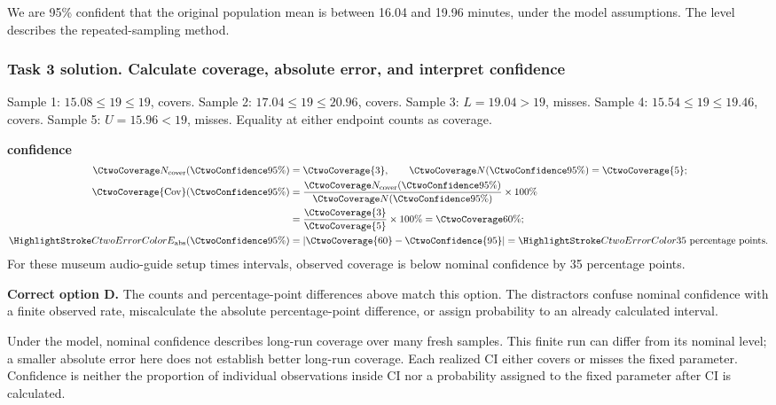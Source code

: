 We are 95\% confident that the original population mean is between 16.04 and 19.96 minutes, under the model assumptions. The level describes the repeated-sampling method.
\par\vspace{3mm}
\clearpage
\subsubsection*{Task 3 solution. Calculate coverage, absolute error, and interpret confidence}
\label{sol:c2-advanced-a-c}
Sample 1: $15.08\leq 19\leq 19$, covers. Sample 2: $17.04\leq 19\leq 20.96$, covers. Sample 3: $L=19.04>19$, misses. Sample 4: $15.54\leq 19\leq 19.46$, covers. Sample 5: $U=15.96<19$, misses. Equality at either endpoint counts as coverage.

\textbf{ confidence}\nopagebreak[4]
\begin{align*}
\CtwoCoverCount(\CtwoConfidence{95\%})&=\CtwoCoverage{3},
\qquad\CtwoTotalCount(\CtwoConfidence{95\%})=\CtwoCoverage{5};\\
\CtwoCoverage{\mathrm{Cov}}(\CtwoConfidence{95\%})
&=\frac{\CtwoCoverCount(\CtwoConfidence{95\%})}{\CtwoTotalCount(\CtwoConfidence{95\%})}\times100\%
\\
&=\frac{\CtwoCoverage{3}}{\CtwoCoverage{5}}\times100\%=\CtwoCoverage{60\%};\\
\CtwoError{E_{\rm abs}}(\CtwoConfidence{95\%})
&=\left|\CtwoCoverage{60}-\CtwoConfidence{95}\right|=\CtwoError{35}\ \text{percentage points}.
\end{align*}
For these museum audio-guide setup times intervals, observed coverage is below nominal confidence by 35 percentage points.

\textbf{Correct option D.} The counts and percentage-point differences above match this option. The distractors confuse nominal confidence with a finite observed rate, miscalculate the absolute percentage-point difference, or assign probability to an already calculated interval.

Under the model, nominal confidence describes long-run coverage over many fresh samples. This finite run can differ from its nominal level; a smaller absolute error here does not establish better long-run coverage. Each realized $\mathrm{CI}$ either covers or misses the fixed parameter. Confidence is neither the proportion of individual observations inside $\mathrm{CI}$ nor a probability assigned to the fixed parameter after $\mathrm{CI}$ is calculated.

